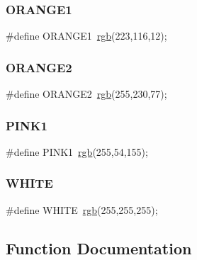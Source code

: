 \hypertarget{group__colors_gabc93b0adf636edc12e8e9e0489429972}{}\label{group__colors_gabc93b0adf636edc12e8e9e0489429972} 
\subsubsection{\texorpdfstring{O\+R\+A\+N\+G\+E1}{ORANGE1}}
{\footnotesize\ttfamily \#define O\+R\+A\+N\+G\+E1~\hyperlink{group__colors_ga8ac8469511c64983e8f0a678a14f0e36}{rgb}(223,116,12);}

\hypertarget{group__colors_ga8ac45568d18ed08eb1ff4e9355110f6e}{}\label{group__colors_ga8ac45568d18ed08eb1ff4e9355110f6e} 
\subsubsection{\texorpdfstring{O\+R\+A\+N\+G\+E2}{ORANGE2}}
{\footnotesize\ttfamily \#define O\+R\+A\+N\+G\+E2~\hyperlink{group__colors_ga8ac8469511c64983e8f0a678a14f0e36}{rgb}(255,230,77);}

\hypertarget{group__colors_ga0514cf5f3dd5549be9c93c6ec588dbd5}{}\label{group__colors_ga0514cf5f3dd5549be9c93c6ec588dbd5} 
\subsubsection{\texorpdfstring{P\+I\+N\+K1}{PINK1}}
{\footnotesize\ttfamily \#define P\+I\+N\+K1~\hyperlink{group__colors_ga8ac8469511c64983e8f0a678a14f0e36}{rgb}(255,54,155);}

\hypertarget{group__colors_ga87b537f5fa5c109d3c05c13d6b18f382}{}\label{group__colors_ga87b537f5fa5c109d3c05c13d6b18f382} 
\subsubsection{\texorpdfstring{W\+H\+I\+TE}{WHITE}}
{\footnotesize\ttfamily \#define W\+H\+I\+TE~\hyperlink{group__colors_ga8ac8469511c64983e8f0a678a14f0e36}{rgb}(255,255,255);}



\subsection{Function Documentation}
\hypertarget{group__colors_ga8ac8469511c64983e8f0a678a14f0e36}{}\label{group__colors_ga8ac8469511c64983e8f0a678a14f0e36} 
